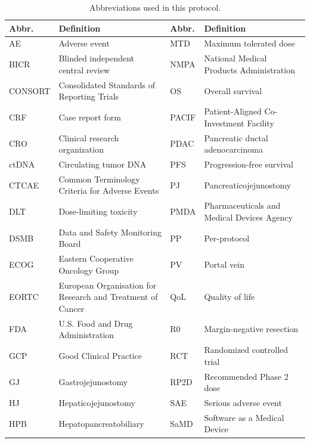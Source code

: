 \begin{table}[h]
\centering
\footnotesize
\caption{Abbreviations used in this protocol.}
\label{tab:abbrev}
\begin{tabularx}{\textwidth}{L{1.3cm} L{6.8cm} L{1.3cm} L{6.2cm}}
\toprule
\textbf{Abbr.} & \textbf{Definition} & \textbf{Abbr.} & \textbf{Definition} \\
\midrule 
AE     & Adverse event                                  & MTD   & Maximum tolerated dose \\
BICR   & Blinded independent central review              & NMPA  & National Medical Products Administration \\
CONSORT& Consolidated Standards of Reporting Trials      & OS    & Overall survival \\
CRF    & Case report form                                & PACIF & Patient-Aligned Co-Investment Facility \\
CRO    & Clinical research organization                  & PDAC  & Pancreatic ductal adenocarcinoma \\
ctDNA  & Circulating tumor DNA                           & PFS   & Progression-free survival \\
CTCAE  & Common Terminology Criteria for Adverse Events  & PJ    & Pancreaticojejunostomy \\
DLT    & Dose-limiting toxicity                          & PMDA  & Pharmaceuticals and Medical Devices Agency \\
DSMB   & Data and Safety Monitoring Board                & PP    & Per-protocol \\
ECOG   & Eastern Cooperative Oncology Group              & PV    & Portal vein \\
EORTC  & \fontsize{7.5}{8.5}\selectfont European Organisation for Research and Treatment of Cancer & QoL & Quality of life \\
FDA    & U.S. Food and Drug Administration               & R0    & Margin-negative resection \\
GCP    & Good Clinical Practice                          & RCT   & Randomized controlled trial \\
GJ     & Gastrojejunostomy                               & RP2D  & Recommended Phase 2 dose \\
HJ     & Hepaticojejunostomy                             & SAE   & Serious adverse event \\
HPB    & Hepatopancreatobiliary                          & SaMD  & Software as a Medical Device \\

\end{tabularx}
\end{table}
